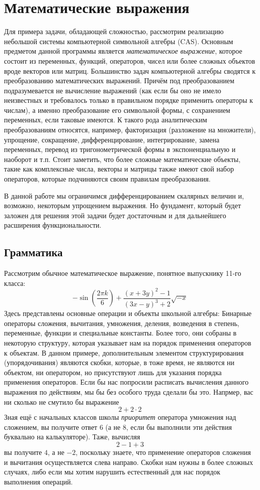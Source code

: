 \documentclass[10pt]{report}
\begin{document}
\section{Математические выражения}
Для примера задачи, обладающей сложностью, рассмотрим реализацию небольшой системы компьютерной символьной алгебры (CAS). 
Основным предметом данной программы является {\em математическое выражение}, которое состоит из переменных, функций, операторов, чисел или более сложных объектов вроде векторов или матриц.
Большинство задач компьютерной алгебры сводятся к преобразованию математических выражений.
Причём под преобразованием подразумевается не вычисление выражений (как если бы оно не имело неизвестных и требовалось только в правильном порядке применить операторы к числам),
	а именно преобразование его символьной формы, с сохранением переменных, если таковые имеются\cite{wolfram, maxima}.
	К такого рода аналитическим преобразованиям относятся, например, 
		факторизация (разложение на множители), упрощение, сокращение, дифференцирование, интегрирование, замена переменных, перевод из тригонометрической формы в экспоненциальную и наоборот и т.п.
	Стоит заметить, что более сложные математические объекты, такие как комплексные числа, векторы и матрицы также имеют свой набор операторов, которые подчиняются своим правилам преобразования.

В данной работе мы ограничимся дифференцированием скалярных величин и, возможно, некоторым упрощением выражения.
Но фундамент, который будет заложен для решения этой задачи будет достаточным и для дальнейшего расширения функциональности.

\subsection{Грамматика}
Рассмотрим обычное математическое выражение, понятное выпускнику 11-го класса:
\begin{equation}
\label{expr}
	-\sin\left(\frac{2\pi k}{6}\right) +\frac{(x+3y)^2-1}{(3x-y)^3+2}\sqrt{-x}
\end{equation}
Здесь представлены основные операции и объекты школьной алгебры: Бинарные операторы сложения, вычитания, умножения, деления, возведения в степень, переменные, функции и специальные константы.
Более того, они собраны в некоторую структуру, которая указывает нам на порядок применения операторов к объектам.
В данном примере, дополнительным элементом структурирования (упорядочивания) являются скобки, которые, в тоже время, не являются ни объектом, ни оператором, но присутствуют лишь для указания порядка применения операторов.
Если бы нас попросили расписать вычисления данного выражения по действиям, мы бы без особого труда сделали бы это.
Напрмер, вас ни сколько не смутило бы выражение
$$
	2+2\cdot 2
$$
Зная ещё с начальных классов школы {\em приоритет} оператора умножения над сложением, вы получите ответ $6$ (а не $8$, если бы выполнили эти действия буквально на калькуляторе).
Таже, вычисляя 
$$
	2-1+3
$$
вы получите $4$, а не $-2$, поскольку знаете, что применение операторов сложения и вычитания осуществляется слева направо. Скобки нам нужны в более сложных случаях, либо если мы хотим нарушить естественный для нас порядок выполнения операций.
\end{document}
